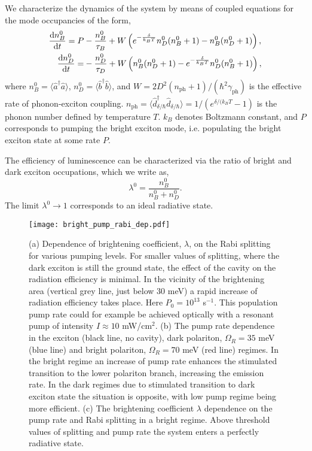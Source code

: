 \documentclass[journal=aamick,manuscript=article]{achemso}
\begin{document}
We characterize the dynamics of the system by means of coupled equations for the mode occupancies of the form,
%
\begin{align}
\label{exc-diff-eq}
\frac{\mathrm{d} n^0_B}{\mathrm{d} t} =P &-\frac{n^0_B}{\tau_B} +W\left(e^{-\frac{\delta}{k_B T}}n^0_D(n^0_B+1)-n^0_B(n^0_D+1)\right), \notag \\
\frac{\mathrm{d} n^0_D}{\mathrm{d} t} = &-\frac{n^0_D}{\tau_D} +W\left( n^0_B(n^0_D+1) -e^{-\frac{\delta}{k_B T}} n^0_D(n^0_B+1) \right), 
\end{align}
%
where $n^0_B=\langle \hat{a}^\dagger\hat{a} \rangle$, $n^0_D=\langle \hat{b}^\dagger\hat{b} \rangle$, and $W=2D^2(n_{\mathrm{ph}}+1)/(\hbar^2 \gamma_{\mathrm{ph}} )$ is the effective rate of phonon-exciton coupling.
$n_{\mathrm{ph}}=\langle \hat{d}_{\delta/\hbar}^\dagger \hat{d}_{\delta/\hbar} \rangle=1/(e^{\delta/(k_B T}-1)$ is the phonon number defined by temperature $T$. $k_B$ denotes Boltzmann constant, and $P$ corresponds to pumping the bright exciton mode, i.e. populating the bright exciton state at some rate $P$. 

The efficiency of luminescence can be characterized via the ratio of bright and dark exciton occupations, which we write as,
%
\begin{equation}
\label{lambda0}
\lambda^0 =\frac{n^0_B}{n^0_B+n^0_D}.
\end{equation}
%
The limit $\lambda^0 \rightarrow 1$ corresponds to an ideal radiative state. 

%
\begin{figure}
  \centering
  \texttt{[image: bright\_pump\_rabi\_dep.pdf]}
  \caption{(a) Dependence of brightening coefficient, $\lambda$, on the Rabi splitting for various pumping levels. For smaller values of splitting, where the dark exciton is still the ground state, the effect of the cavity on the radiation efficiency is minimal. In the vicinity of the brightening area (vertical grey line, just below 30 meV) a rapid increase of radiation efficiency takes place. Here  $P_0=10^{13}$ s$^{-1}$. This population pump rate could for example be achieved optically with a resonant pump of intensity $I\approx 10$ mW/cm$^2$. (b) The pump rate dependence in the exciton (black line, no cavity), dark polariton, $\Omega_R=35$ meV (blue line) and bright polariton, $\Omega_R=70$ meV (red line) regimes. In the bright regime an increase of pump rate enhances the stimulated transition to the lower polariton branch, increasing the emission rate. In the dark regimes due to stimulated transition to dark exciton state the situation is opposite, with low pump regime being more efficient.
  (c) The brightening coefficient $\lambda$ dependence on the pump rate and Rabi splitting in a bright regime. Above threshold values of splitting and pump rate the system enters a perfectly radiative state.}
  \label{Rabi_pump_dep}
\end{figure}
%
\end{document}
